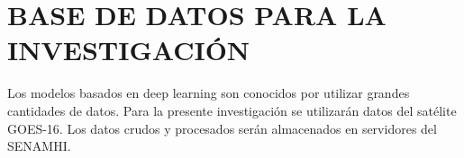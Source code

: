 \chapter{BASE DE DATOS PARA LA INVESTIGACIÓN}

Los modelos basados en deep learning son conocidos por utilizar grandes 
cantidades de datos. Para la presente investigación se utilizarán datos del 
satélite GOES-16. Los datos crudos y procesados serán almacenados en servidores 
del SENAMHI.

